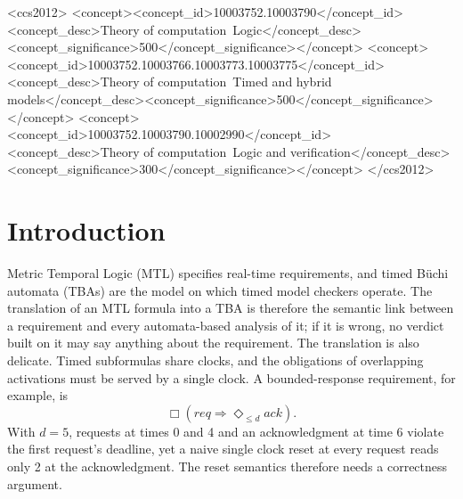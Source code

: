 \documentclass[manuscript]{acmart}
\begin{document}
\begin{CCSXML}
<ccs2012>
<concept><concept_id>10003752.10003790</concept_id><concept_desc>Theory of computation~Logic</concept_desc><concept_significance>500</concept_significance></concept>
<concept><concept_id>10003752.10003766.10003773.10003775</concept_id><concept_desc>Theory of computation~Timed and hybrid models</concept_desc><concept_significance>500</concept_significance></concept>
<concept><concept_id>10003752.10003790.10002990</concept_id><concept_desc>Theory of computation~Logic and verification</concept_desc><concept_significance>300</concept_significance></concept>
</ccs2012>
\end{CCSXML}


\maketitle

\section{Introduction}
\label{sec:introduction}
Metric Temporal Logic (MTL) specifies real-time requirements, and timed
B\"uchi automata (TBAs) are the model on which timed model checkers operate.
The translation of an MTL formula into a TBA is therefore the semantic link
between a requirement and every automata-based analysis of it; if it is wrong,
no verdict built on it may say anything about the requirement. The translation is
also delicate. Timed subformulas share clocks, and the obligations of
overlapping activations must be served by a single clock. A bounded-response
requirement, for example, is
\begin{equation*}
\Box(\mathit{req}\Rightarrow\Diamond_{\le d}\mathit{ack}).
\end{equation*}
With $d=5$, requests at times 0 and 4 and an acknowledgment at time 6 violate
the first request's deadline, yet a naive single clock reset at every request
reads only 2 at the acknowledgment. The reset semantics therefore needs a
correctness argument.
\end{document}
